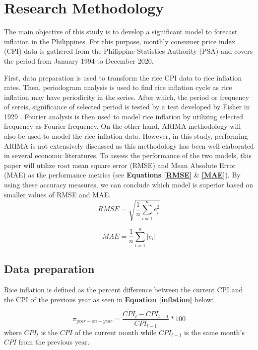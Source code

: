 
\section{Research Methodology}

The main objective of this study is to develop a significant model to forecast inflation in the Philippines. For this purpose, monthly consumer price index (CPI) data is gathered from the Philippine Statistics Authority (PSA) and covers the period from January 1994 to December 2020.

First, data preparation is used to transform the rice CPI data to rice inflation rates. Then, periodogram analysis is used to find rice inflation cycle as rice inflation may have periodicity in the series. After which, the period or frequency of sereis, significance of selected period is tested by a test developed by Fisher in 1929 \cite{fisher1929tests}. Fourier analysis is then used to model rice inflation by utilizing selected frequency as Fourier frequency. On the other hand, ARIMA methodology will also be used to model the rice inflation data. However, in this study, performing ARIMA is not extensively discussed as this methodology has been well elaborated in several economic literatures. To assess the performance of the two models, this paper will utilize root mean square error (RMSE) and Mean Absolute Error (MAE) as the performance metrics (see \textbf{Equations \ref{RMSE}} \& \textbf{\ref{MAE}}). By using these accuracy measures, we can conclude which model is superior based on smaller values of RMSE and MAE.
\begin{equation} \label{RMSE}
	RMSE = \sqrt{\frac{1}{n} \sum_{i=1}^{n} e_i^2}
\end{equation}

\begin{equation} \label{MAE}
	MAE = \frac{1}{n} \sum_{i=1}^{n} |e_i|
\end{equation}
\subsection{Data preparation}
Rice inflation is defined as the percent difference between the current CPI and the CPI of the previous year as seen in \textbf{Equation \ref{inflation}} below:

\begin{equation} \label{inflation}
	\pi _{year-on-year} = \frac{CPI_t - CPI _{t-1}}{CPI_{t-1}} * 100
\end{equation}
where $CPI_t$ is the $CPI$ of the current month while $CPI_{t-1}$ is the same month's $CPI$ from the previous year.

